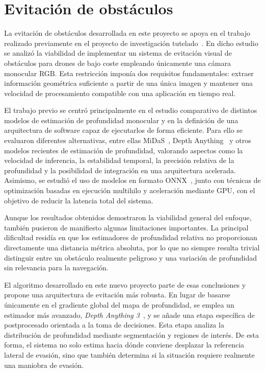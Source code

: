 \chapter{Evitación de obstáculos}

La evitación de obstáculos desarrollada en este proyecto se apoya en el 
trabajo realizado previamente en el proyecto de investigación tutelado~\cite{estudio-nav2D}. En dicho 
estudio se analizó la viabilidad de implementar un sistema de evitación visual de obstáculos para drones de bajo 
coste empleando únicamente una cámara monocular RGB. Esta restricción imponía dos requisitos fundamentales: extraer información geométrica 
suficiente a partir de una única imagen y mantener una velocidad de procesamiento compatible con una aplicación en tiempo real.

El trabajo previo se centró principalmente en el estudio comparativo de distintos modelos de estimación 
de profundidad monocular y en la definición de una arquitectura de software capaz de ejecutarlos de forma 
eficiente. Para ello se evaluaron diferentes alternativas, entre ellas MiDaS~\cite{Ranftl2020}, Depth 
Anything~\cite{cheng2024depthanything} y otros modelos recientes de estimación de profundidad, valorando 
aspectos como la velocidad de inferencia, la estabilidad temporal, la precisión relativa de la 
profundidad y la posibilidad de integración en una arquitectura acelerada. Asimismo, se estudió 
el uso de modelos en formato ONNX~\cite{onnx_repo}, junto con técnicas de optimización basadas en 
ejecución multihilo y aceleración mediante GPU, con el objetivo de reducir la latencia total del 
sistema.

Aunque los resultados obtenidos demostraron la viabilidad general del enfoque, también pusieron de 
manifiesto algunas limitaciones importantes. La principal dificultad residía en que los estimadores de 
profundidad relativa no proporcionan directamente una distancia métrica absoluta, por lo que no siempre 
resulta trivial distinguir entre un obstáculo realmente peligroso y una variación de profundidad sin 
relevancia para la navegación.

El algoritmo desarrollado en este nuevo proyecto parte de esas conclusiones y propone una arquitectura 
de evitación más robusta. En lugar de basarse únicamente en el gradiente global del mapa de profundidad, 
se emplea un estimador más avanzado, \textit{Depth Anything 3}~\cite{overview-da}, y se añade una etapa 
específica de postprocesado orientada a la toma de decisiones. Esta etapa analiza la distribución de 
profundidad mediante segmentación y regiones de interés. De esta forma, el sistema no solo estima hacia 
dónde conviene desplazar la referencia lateral de evasión, sino que también determina si la situación requiere realmente una 
maniobra de evasión.


